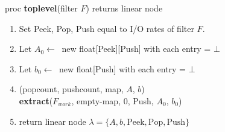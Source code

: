 \begin{algorithm}
proc {\bf toplevel}(filter $F$) returns linear node
\begin{enumerate}
\item Set Peek, Pop, Push equal to I/O rates of filter $F$.
\item Let $A_{0} \leftarrow~$ new float[Peek][Push] with each entry = $\bot$
\item Let $b_{0} \leftarrow~$ new float[Push] with each entry = $\bot$
\item (popcount, pushcount, map, $A$, $b$) \la \\
{\bf extract}($F_{work}$, empty-map, 0, Push, $A_{0}$, $b_{0}$)
\item
\begin{algorithmic}
\STATE return linear node $\lambda = \{A, b, \mbox{Peek}, \mbox{Pop}, \mbox{Push}\}$
\ELSE
{}
\ENDIF
\end{algorithmic}
\end{enumerate}
\end{algorithm}


